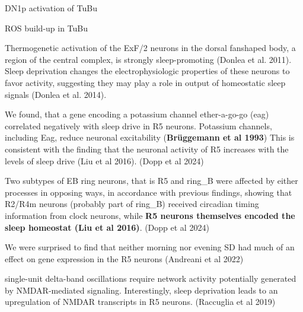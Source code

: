     DN1p activation of TuBu

    ROS build-up in TuBu


    Thermogenetic activation of the ExF/2 neurons in the dorsal fanshaped body, a 
region of the central complex, is strongly sleep-promoting (Donlea et al. 2011). Sleep 
deprivation changes the electrophysiologic properties of these neurons to favor activity,
suggesting they may play a role in output of homeostatic sleep signals (Donlea et al. 2014).

We found, that a gene encoding a potassium channel ether-a-go-go (eag) correlated negatively with sleep drive in R5 neurons.
    Potassium channels, including Eag, reduce neuronal excitability (\textbf{Brüggemann et al 1993})
    This is consistent with the finding that the neuronal activity of R5 increases with the levels of sleep drive
    (Liu et al 2016).
    (Dopp et al 2024)

    Two subtypes of EB ring neurons, that is R5 and ring\_B were affected by either processes in opposing ways, in
    accordance with previous findings, showing that R2/R4m neurons (probably part of ring\_B) received circadian timing
    information from clock neurons, while \textbf{R5 neurons themselves encoded the sleep homeostat (Liu et al 2016)}.
    (Dopp et al 2024)


    We were surprised to find that neither morning nor evening SD had much of an effect on gene expression in the R5 neurons
    \parencite{andreaniCircadianProgrammingEllipsoid2022} (Andreani et al 2022)

    single-unit delta-band oscillations require network activity potentially generated by NMDAR-mediated signaling. Interestingly, sleep deprivation leads to an upregulation of NMDAR transcripts in R5 neurons.
    \parencite{raccugliaNetworkSpecificSynchronizationElectrical2019} (Raccuglia et al 2019)


